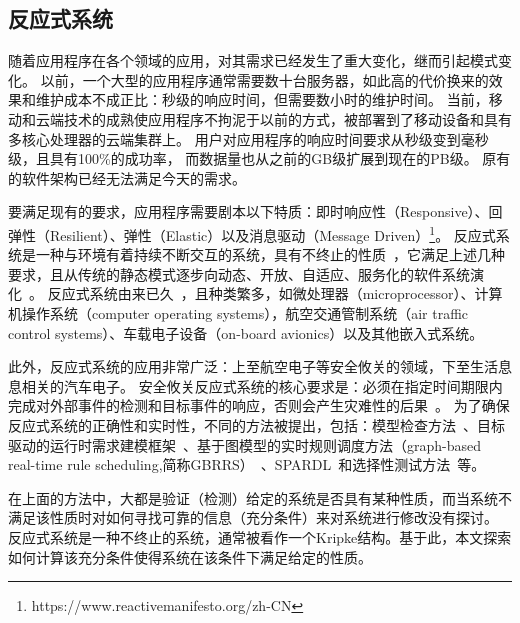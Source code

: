 \subsection{反应式系统}
随着应用程序在各个领域的应用，对其需求已经发生了重大变化，继而引起模式变化。
以前，一个大型的应用程序通常需要数十台服务器，如此高的代价换来的效果和维护成本不成正比：秒级的响应时间，但需要数小时的维护时间。
当前，移动和云端技术的成熟使应用程序不拘泥于以前的方式，被部署到了移动设备和具有多核心处理器的云端集群上。
用户对应用程序的响应时间要求从秒级变到毫秒级，且具有100\%的成功率， 而数据量也从之前的GB级扩展到现在的PB级。
原有的软件架构已经无法满足今天的需求。

要满足现有的要求，应用程序需要剧本以下特质：即时响应性（Responsive）、回弹性（Resilient）、弹性（Elastic）以及消息驱动（Message Driven）\footnote{https://www.reactivemanifesto.org/zh-CN}。
反应式系统是一种与环境有着持续不断交互的系统，具有不终止的性质~\cite{DBLP:series/txtcs/Schneider04}，它满足上述几种要求，且从传统的静态模式逐步向动态、开放、自适应、服务化的软件系统演化~\cite{jian2012}。
反应式系统由来已久~\cite{DBLP:conf/nato/HarelP84,DBLP:books/sp/trends86/Pnueli86}，且种类繁多，如微处理器（microprocessor）、计算机操作系统（computer operating systems），航空交通管制系统（air traffic control systems）、车载电子设备（on-board avionics）以及其他嵌入式系统。

此外，反应式系统的应用非常广泛：上至航空电子等安全攸关的领域，下至生活息息相关的汽车电子。
安全攸关反应式系统的核心要求是：必须在指定时间期限内完成对外部事件的检测和目标事件的响应，否则会产生灾难性的后果~\cite{wangjuan2019}。
为了确保反应式系统的正确性和实时性，不同的方法被提出，包括：模型检查方法~\cite{DBLP:books/daglib/0007403,clarke1996model,DBLP:series/txtcs/Schneider04}、目标驱动的运行时需求建模框架~\cite{jian2012}、基于图模型的实时规则调度方法（graph-based real-time rule scheduling,简称GBRRS）~\cite{wangjuan2019}、SPARDL~\cite{wangzhen2012}和选择性测试方法~\cite{lishu2004}等。

在上面的方法中，大都是验证（检测）给定的系统是否具有某种性质，而当系统不满足该性质时对如何寻找可靠的信息（充分条件）来对系统进行修改没有探讨。
反应式系统是一种不终止的系统，通常被看作一个Kripke结构。基于此，本文探索如何计算该充分条件使得系统在该条件下满足给定的性质。




